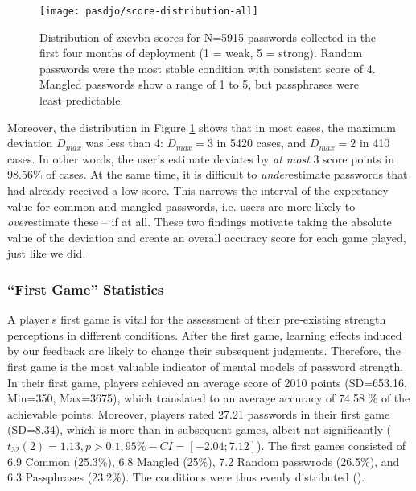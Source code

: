 \begin{figure}[htbp]
	\centering
	\texttt{[image: pasdjo/score-distribution-all]}
	\caption{\label{fig:pasdjo:zxcvbn-score-distribution} Distribution of zxcvbn scores for N=5915 passwords collected in the first four months of deployment (1 = weak, 5 = strong). Random passwords were the most stable condition with consistent score of 4. Mangled passwords show a range of 1 to 5, but passphrases were least predictable.}
\end{figure}

Moreover, the distribution in Figure \ref{fig:pasdjo:zxcvbn-score-distribution} shows that in most cases, the maximum deviation $D_{max}$ was less than 4: $D_{max} = 3$ in 5420 cases, and $D_{max} = 2$ in 410 cases. In other words, the user's estimate deviates by \textit{at most} 3 score points in 98.56\% of cases. At the same time, it is difficult to \textit{under}estimate passwords that had already received a low score. This narrows the interval of the expectancy value for common and mangled passwords, i.e. users are more likely to \textit{over}estimate these -- if at all. These two findings motivate taking the absolute value of the deviation and create an overall accuracy score for each game played, just like we did. 


\subsubsection{``First Game'' Statistics}
A player's first game is vital for the assessment of their pre-existing strength perceptions in different conditions. After the first game, learning effects induced by our feedback are likely to change their subsequent judgments. Therefore, the first game is the most valuable indicator of mental models of password strength. In their first game, players achieved an average score of 2010 points (SD=653.16, Min=350, Max=3675), which translated to an average accuracy of 74.58 \% of the achievable points. Moreover, players rated 27.21 passwords in their first game (SD=8.34), which is more than in subsequent games, albeit not significantly ($t_{32}(2) = 1.13, p > 0.1, 95\%-CI = [-2.04;7.12]$).%
The first games consisted of 6.9 Common (25.3\%), 6.8 Mangled (25\%), 7.2 Random passwrods (26.5\%), and 6.3 Passphrases (23.2\%). The conditions were thus evenly distributed (). 

